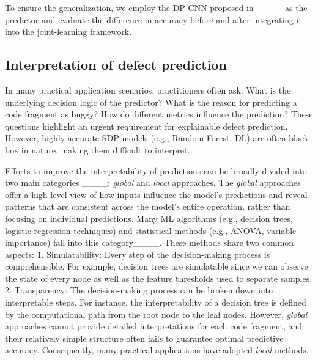 To ensure the generalization, we employ the DP-CNN proposed in ____ as the predictor and evaluate the difference in accuracy before and after integrating it into the joint-learning framework.

\subsection{Interpretation of defect prediction}
In many practical application scenarios, practitioners often ask: What is the underlying decision logic of the predictor? What is the reason for predicting a code fragment as buggy? How do different metrics influence the prediction? These questions highlight an urgent requirement for explainable defect prediction. However, highly accurate SDP models (e.g., Random Forest, DL) are often black-box in nature, making them difficult to interpret.

Efforts to improve the interpretability of predictions can be broadly divided into two main categories ____: \textit{global} and \textit{local} approaches. The \textit{global} approaches offer a high-level view of how inputs influence the model’s predictions and reveal patterns that are consistent across the model’s entire operation, rather than focusing on individual predictions. Many ML algorithms (e.g., decision trees, logistic regression techniques) and statistical methods (e.g., ANOVA, variable importance) fall into this category____. These methods share two common aspects: 1. Simulatability: Every step of the decision-making process is comprehensible. For example, decision trees are simulatable since we can observe the state of every node as well as the feature thresholds used to separate samples. 2. Transparency: The decision-making process can be broken down into interpretable steps. For instance, the interpretability of a decision tree is defined by the computational path from the root node to the leaf nodes.
However, \textit{global} approaches cannot provide detailed interpretations for each code fragment, and their relatively simple structure often fails to guarantee optimal predictive accuracy. Consequently, many practical applications have adopted \textit{local} methods.

